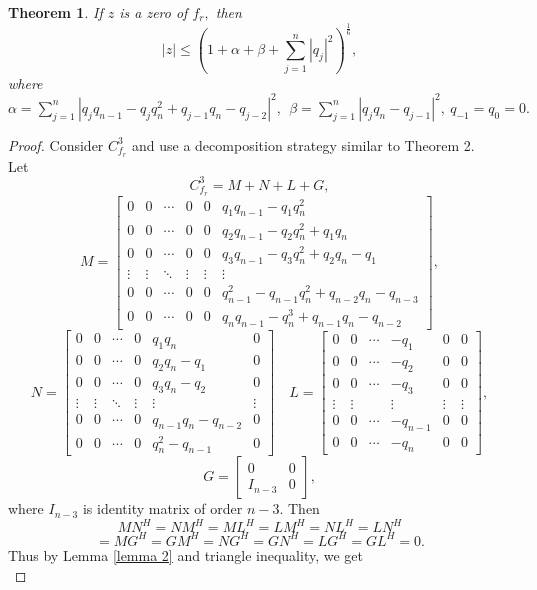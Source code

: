 \documentclass [12pt]{article}
\newtheorem{theorem}{Theorem}
\begin{document}
\begin{theorem}
    If $z$ is a zero of $f_{r},$ then\\
    $$|z|\le \left(1+\alpha+\beta+\sum_{j=1}^{n}|q_{j}|^{2}\right)^\frac{1}{6},$$
    where $\alpha=\sum_{j=1}^{n}|q_{j}q_{n-1}-q_{j}q^{2}_{n}+q_{j-1}q_{n}-q_{j-2}|^{2},~~\beta=\sum_{j=1}^{n}|q_{j}q_{n}-q_{j-1}|^{2},~ q_{-1}=q_{0}=0.$ 
\end{theorem}
\begin{proof}
    Consider $C_{f_{r}}^3$ and use a decomposition strategy similar to Theorem 2. \\Let
\[
C_{f_r}^3 = M + N + L + G,
\]
\[M = 
\begin{bmatrix}
0 & 0 & \cdots & 0&0 & q_{1}q_{n-1}-q_{1}q^{2}_{n} \\
0 & 0 & \cdots & 0&0& q_{2}q_{n-1}-q_{2}q^{2}_{n}+q_{1}q_{n}\\
0 & 0 & \cdots & 0 &0& q_{3}q_{n-1}-q_{3}q^{2}_{n}+q_{2}q_{n}-q_{1}\\
\vdots  &\vdots & \ddots &\vdots& \vdots & \vdots \\
0 & 0 & \cdots & 0 & 0&q^{2}_{n-1}-q_{n-1}q^{2}_{n}+q_{n-2}q_{n}-q_{n-3}\\
0 & 0 & \cdots & 0 & 0&q_{n}q_{n-1}-q^{3}_{n}+q_{n-1}q_{n}-q_{n-2}
\end{bmatrix},
\]
\[
N = 
\begin{bmatrix}
0 & 0 & \cdots & 0&q_{1}q_{n} & 0 \\
0 & 0 & \cdots & 0&q_{2}q_{n}-q_{1}& 0 \\
0 & 0 & \cdots & 0 &q_{3}q_{n}-q_{2}& 0 \\
\vdots  &\vdots & \ddots &\vdots& \vdots & \vdots \\
0 & 0 & \cdots & 0 & q_{n-1}q_{n}-q_{n-2}&0\\
0 & 0 & \cdots & 0 &q^{2}_{n}-q_{n-1}&0
\end{bmatrix}
\quad
L= 
\begin{bmatrix}
0 & 0 & \cdots  &-q_{1} & 0 &0\\
0 & 0 & \cdots  &-q_{2}& 0&0 \\
0 & 0 & \cdots  &-q_{3}& 0&0 \\
\vdots  &\vdots &  &\vdots& \vdots & \vdots \\
0 & 0 & \cdots  & -q_{n-1}&0&0\\
0 & 0 & \cdots  & -q_{n}&0&0
\end{bmatrix},
\]
\[
 G=\begin{bmatrix}
    0&0\\I_{n-3}&0
\end{bmatrix},\]
where $I_{n-3} $ is identity matrix of order $n-3.$
Then
\[
 MN^{H}=NM^{H}=ML^{H}= LM^{H} = NL^{H}=L N^{H}\]\[=MG^{H}=GM^{H}=NG^{H}=GN^{H} =LG^H=GL^{H}=0.
\]
Thus by Lemma \ref{lemma 2} and triangle inequality, we get\\



\end{proof}
\end{document}

